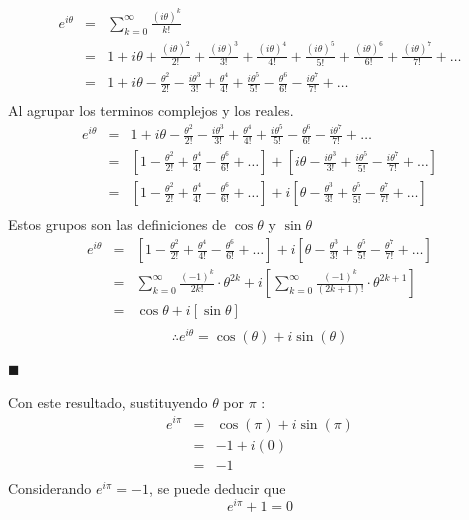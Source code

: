 \documentclass[12pt]{article}
\begin{document}
\begin{eqnarray}
e^{i\theta} 
& = &   \sum_{k=0}^{\infty}\frac{(i\theta)^{k}}{k!} \nonumber
\\
& = & 1 + i\theta + \frac{(i\theta)^2}{2!} + \frac{(i\theta)^3}{3!}+ \frac{(i\theta)^4}{4!}+ \frac{(i\theta)^5}{5!} + \frac{(i\theta)^6}{6!} + \frac{(i\theta)^7}{7!}+ \ldots  \nonumber
\\
& = &  1 + i\theta - \frac{\theta^2}{2!} - \frac{i\theta^3}{3!}+ \frac{\theta^4}{4!}+ \frac{i\theta^5}{5!} - \frac{\theta^6}{6!} - \frac{i\theta^7}{7!}+ \ldots  \nonumber
\\\nonumber
\end{eqnarray}
Al agrupar los terminos complejos y los reales.
\begin{eqnarray}
e^{i\theta} 
& = &  1 + i\theta - \frac{\theta^2}{2!} - \frac{i\theta^3}{3!}+ \frac{\theta^4}{4!}+ \frac{i\theta^5}{5!} - \frac{\theta^6}{6!} - \frac{i\theta^7}{7!}+ \ldots  \nonumber
\\
& = &  [1 - \frac{\theta^2}{2!} + \frac{\theta^4}{4!}- \frac{\theta^6}{6!} + \ldots ]+[i\theta   - \frac{i\theta^3}{3!}+ \frac{i\theta^5}{5!} - \frac{i\theta^7}{7!}+ \ldots]  \nonumber
\\
& = &  [1 - \frac{\theta^2}{2!} + \frac{\theta^4}{4!}- \frac{\theta^6}{6!} + \ldots ]+i[\theta   - \frac{\theta^3}{3!}+ \frac{\theta^5}{5!} - \frac{\theta^7}{7!}+ \ldots]  \nonumber
\\\nonumber
\end{eqnarray}
Estos grupos son las definiciones de $\cos\theta$ y $\sin\theta$
\begin{eqnarray}
e^{i\theta} \nonumber
& = &  [1 - \frac{\theta^2}{2!} + \frac{\theta^4}{4!}- \frac{\theta^6}{6!} + \ldots ]+i[\theta   - \frac{\theta^3}{3!}+ \frac{\theta^5}{5!} - \frac{\theta^7}{7!}+ \ldots]  \nonumber
\\
& = & \sum_{k=0}^{\infty}\frac{(-1)^{k}}{2k!} \cdot \theta ^{2k} +i [\sum_{k=0}^{\infty}\frac{(-1)^{k}}{(2k+1)!} \cdot \theta ^{2k+1}] \nonumber
\\
& = & \cos\theta +i [\sin\theta] \nonumber
\\ \nonumber
\end{eqnarray}
\[
\therefore e^{i\theta} = \cos(\theta) + i \sin(\theta)
\]
\begin{flushright}
$\blacksquare$
\end{flushright}
Con este resultado, sustituyendo $\theta$ por $\pi$ :
\begin{eqnarray}
e^{i\pi} \nonumber
& = &  \cos(\pi) + i \sin(\pi) \nonumber
\\
& = &  -1 + i (0) \nonumber
\\
& = &  -1\nonumber
\\ \nonumber
\end{eqnarray}
Considerando $e^{i\pi} = -1$, se puede deducir que 
\[
e^{i\pi} +1 = 0
\]
\end{document}
